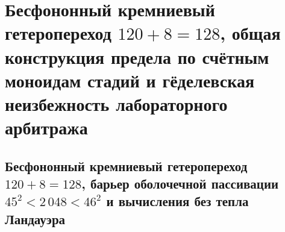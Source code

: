 \chapter{Бесфононный кремниевый гетеропереход \texorpdfstring{$120 + 8 = 128$}{120 + 8 = 128}, общая конструкция предела по счётным моноидам стадий и гёделевская неизбежность лабораторного арбитража}
\label{ch:mono-solar-photovoltaics}
\label{sec:mono-epistemological-closure}

\section{Бесфононный кремниевый гетеропереход \texorpdfstring{$120 + 8 = 128$}{120 + 8 = 128}, барьер оболочечной пассивации \texorpdfstring{$45^2 < 2\,048 < 46^2$}{45^2 < 2048 < 46^2} и вычисления без тепла Ландауэра}

